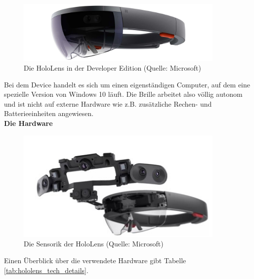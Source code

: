 \begin{figure}[h!]
	\centering
	\includegraphics[width=0.9\textwidth]{images/hololens.jpg}
	\caption{Die HoloLens in der Developer Edition (Quelle: Microsoft)}
	\label{img:hololens}
\end{figure}

Bei dem Device handelt es sich um einen eigenständigen Computer, auf dem eine spezielle Version von Windows 10 läuft. Die Brille arbeitet also völlig autonom und ist nicht auf externe Hardware wie z.B. zusätzliche Rechen- und Batterieeinheiten angewiesen.\\

\textbf{Die Hardware}\\
\begin{figure}[h!]
	\centering
	\includegraphics[width=0.9\textwidth]{images/hololens_tech.jpg}
	\caption{Die Sensorik der HoloLens (Quelle: Microsoft)}
	\label{img:hololens_tech}
\end{figure}

Einen Überblick über die verwendete Hardware gibt Tabelle \ref{tab:hololens_tech_details}.

